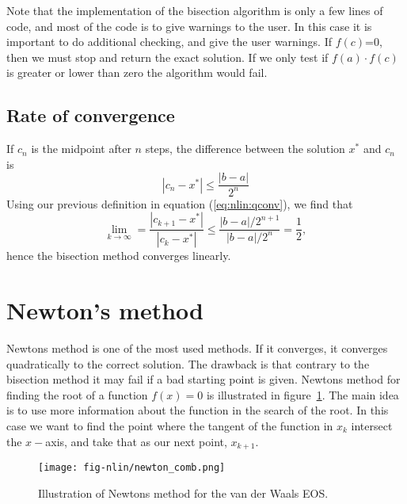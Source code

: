 \documentclass[graybox,sectrefs,envcountresetchap,open=right,final]{svmonodo}
\newenvironment{graybox2admon}[1][]{
\begin{graybox2mdframed}[frametitle=#1]
}
{
\end{graybox2mdframed}
}
\begin{document}
\begin{graybox2admon}[Warnings]
Note that the implementation of the bisection algorithm is only a few lines of code, and most of the code is to give warnings to the user. In this case it is important to do additional checking, and give the user warnings. If $f(c)$=0, then we must stop and return the exact solution. If we only test if $f(a)\cdot f(c)$ is greater or lower than zero the algorithm would fail.
\end{graybox2admon}




\subsection{Rate of convergence}
If $c_n$ is the midpoint after $n$ steps, the difference between the solution $x^*$ and $c_n$ is
\begin{equation}
|c_n-x^*| \le \frac{|b-a|}{2^n}
\label{eq:nlin:bisec}
\end{equation}
Using our previous definition in equation (\ref{eq:nlin:qconv}), we find that
\begin{equation}
\lim_{k\to\infty}=\frac{|c_{k+1}-x^*|}{|c_k-x^*|}\le\frac{|b-a|/2^{n+1}}{|b-a|/2^n}=\frac{1}{2},
\label{eq:nlin:bsc1}
\end{equation}
hence the bisection method converges linearly.
\section{Newton's method}
Newtons method is one of the most used methods. If it converges, it converges quadratically to the correct solution. The drawback is that contrary to the bisection method it may fail if a bad starting point is given. Newtons method for finding the root of a function $f(x)=0$ is illustrated in figure~\ref{fig:nlin:newton}. The main idea is to use more information about the function in the search of the root. In this case we want to find the point where the tangent of the function in $x_k$ intersect the $x-$axis, and take that as our next point, $x_{k+1}$. 

\begin{figure}[!ht]  %
  \centerline{\texttt{[image: fig-nlin/newton\_comb.png]}}
  \caption{
  Illustration of Newtons method for the van der Waals EOS.\label{fig:nlin:newton}
  }
\end{figure}
\end{document}

